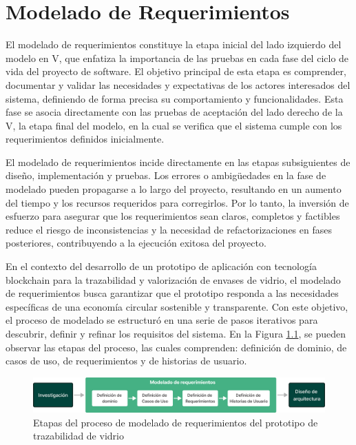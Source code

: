 \chapter[Modelado de Requerimientos]{Modelado de Requerimientos}
\label{cp:modelling}

\parindent0pt

El modelado de requerimientos constituye la etapa inicial del lado izquierdo del modelo en V, que enfatiza la importancia de las pruebas en cada fase del ciclo de vida del proyecto de software. El objetivo principal de esta etapa es comprender, documentar y validar las necesidades y expectativas de los actores interesados del sistema, definiendo de forma precisa su comportamiento y funcionalidades. Esta fase se asocia directamente con las pruebas de aceptación del lado derecho de la V, la etapa final del modelo, en la cual se verifica que el sistema cumple con los requerimientos definidos inicialmente.

El modelado de requerimientos incide directamente en las etapas subsiguientes de diseño, implementación y pruebas. Los errores o ambigüedades en la fase de modelado pueden propagarse a lo largo del proyecto, resultando en un aumento del tiempo y los recursos requeridos para corregirlos. Por lo tanto, la inversión de esfuerzo para asegurar que los requerimientos sean claros, completos y factibles reduce el riesgo de inconsistencias y la necesidad de refactorizaciones en fases posteriores, contribuyendo a la ejecución exitosa del proyecto.

En el contexto del desarrollo de un prototipo de aplicación con tecnología blockchain para la trazabilidad y valorización de envases de vidrio, el modelado de requerimientos busca garantizar que el prototipo responda a las necesidades específicas de una economía circular sostenible y transparente. Con este objetivo, el proceso de modelado se estructuró en una serie de pasos iterativos para descubrir, definir y refinar los requisitos del sistema. En la Figura \ref{fig:requirements-modelling-process}, se pueden observar las etapas del proceso, las cuales comprenden: definición de dominio, de casos de uso, de requerimientos y de historias de usuario.

\begin{figure}[!htb]
    \centering
    \includegraphics[width=\linewidth]{Figures/requirements-modelling.png}
    \caption{Etapas del proceso de modelado de requerimientos del prototipo de trazabilidad de vidrio}
    \label{fig:requirements-modelling-process}
\end{figure}

